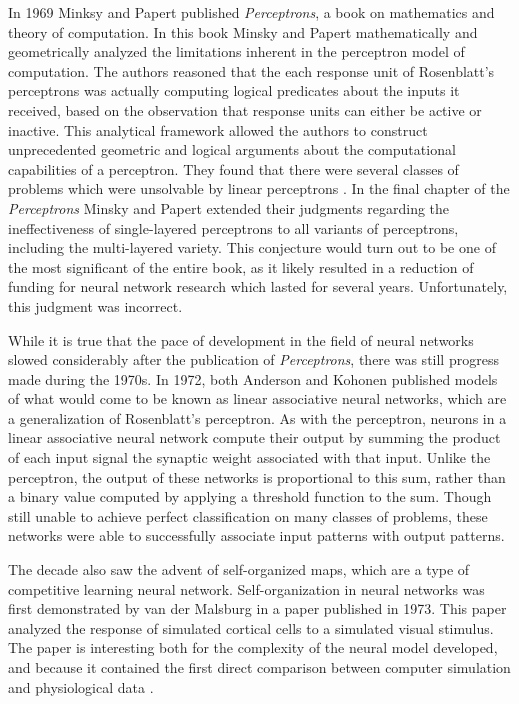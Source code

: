 \documentclass[11pt]{afthesis}
\begin{document}
	In 1969 Minksy and Papert published \textit{Perceptrons}, a book on mathematics and theory of computation. In this book Minsky and Papert mathematically and geometrically analyzed the limitations inherent in the perceptron model of computation. The authors reasoned that the each response unit of Rosenblatt's perceptrons was actually computing logical predicates about the inputs it received, based on the observation that response units can either be active or inactive. This analytical framework allowed the authors to construct unprecedented geometric and logical arguments about the computational capabilities of a perceptron. They found that there were several classes of problems which were unsolvable by linear perceptrons \cite{minsky1969perceptrons}. In the final chapter of the \textit{Perceptrons} Minsky and Papert extended their judgments regarding the ineffectiveness of single-layered perceptrons to all variants of perceptrons, including the multi-layered variety. This conjecture would turn out to be one of the most significant of the entire book, as it likely resulted in a reduction of funding for neural network research \cite{anderson1988neurocomputing} which lasted for several years. Unfortunately, this judgment was incorrect.
	
	While it is true that the pace of development in the field of neural networks slowed considerably after the publication of \textit{Perceptrons}, there was still progress made during the 1970s. In 1972, both Anderson \cite{anderson1972interactive} and Kohonen \cite{kohonen1972correlation} published models of what would come to be known as linear associative neural networks, which are a generalization of Rosenblatt's perceptron. As with the perceptron, neurons in a linear associative neural network compute their output by summing the product of each input signal the synaptic weight associated with that input. Unlike the perceptron, the output of these networks is proportional to this sum, rather than a binary value computed by applying a threshold function to the sum. Though still unable to achieve perfect classification on many classes of problems, these networks were able to successfully associate input patterns with output patterns. 
	
	The decade also saw the advent of self-organized maps, which are a type of competitive learning neural network. Self-organization in neural networks was first demonstrated by van der Malsburg in a paper \cite{vonderMalsburg1973selforganization} published in 1973. This paper analyzed the response of simulated cortical cells to a simulated visual stimulus. The paper is interesting both for the complexity of the neural model developed, and because it contained the first direct comparison between computer simulation and physiological data \cite{anderson1988neurocomputing}. 
	
\end{document}
